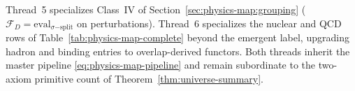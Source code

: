 \begin{remark}
Thread~5 specializes Class~IV of Section~\ref{sec:physics-map:grouping}
($\mathcal{F}_D=\mathrm{eval}_{\sigma\mathrm{-split}}$ on perturbations).
Thread~6 specializes the nuclear and QCD rows of
Table~\ref{tab:physics-map-complete} beyond the emergent label, upgrading
hadron and binding entries to overlap-derived functors. Both threads inherit
the master pipeline \eqref{eq:physics-map-pipeline} and remain subordinate to
the two-axiom primitive count of Theorem~\ref{thm:universe-summary}.
\end{remark}